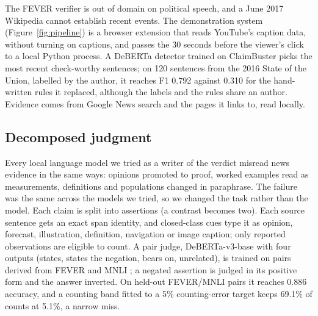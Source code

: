 \documentclass[11pt]{article}
\begin{document}
The FEVER verifier is out of domain on political speech, and a June 2017 Wikipedia cannot establish recent
events. The demonstration system (Figure~\ref{fig:pipeline}) is a browser extension that reads YouTube's
caption data, without turning on captions, and passes the 30 seconds before the viewer's click to a local
Python process. A DeBERTa detector trained on ClaimBuster \citep{arslan2020benchmark} picks the most recent
check-worthy sentences; on 120 sentences from the 2016 State of the Union, labelled by the author, it
reaches F1 0.792 against 0.310 for the hand-written rules it replaced, although the labels and the rules
share an author. Evidence comes from Google News search and the pages it links to, read locally.

\subsection{Decomposed judgment}

Every local language model we tried as a writer of the verdict misread news evidence in the same ways:
opinions promoted to proof, worked examples read as measurements, definitions and populations changed in
paraphrase. The failure was the same across the models we tried, so we changed the task rather than the
model. Each claim is split into assertions (a contrast becomes two). Each source sentence gets an exact
span identity, and closed-class cues type it as opinion, forecast, illustration, definition, navigation or
image caption; only reported observations are eligible to count. A pair judge, DeBERTa-v3-base with four
outputs (states, states the negation, bears on, unrelated), is trained on pairs derived from FEVER and MNLI
\citep{williams2018mnli}; a negated assertion is judged in its positive form and the answer inverted. On
held-out FEVER/MNLI pairs it reaches 0.886 accuracy, and a counting band fitted to a 5\% counting-error
target keeps 69.1\% of counts at 5.1\%, a narrow miss.
\end{document}
